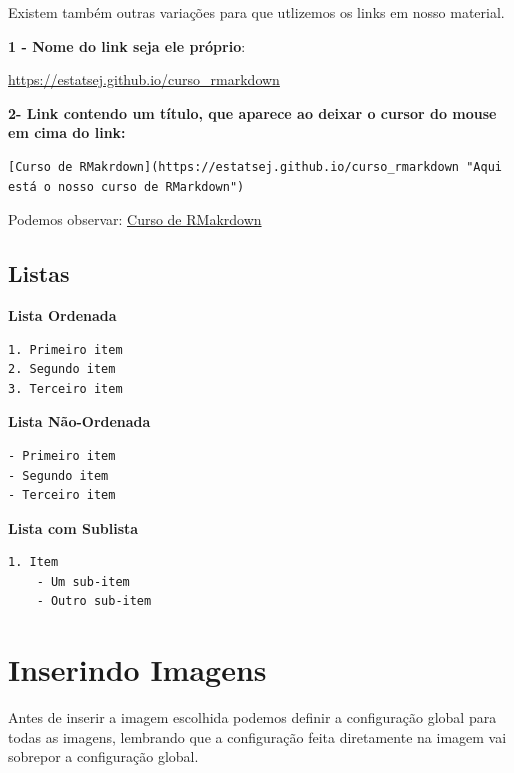 \documentclass[
]{book}
\newenvironment{Shaded}{\begin{snugshade}}{\end{snugshade}}
\newcommand{\InformationTok}[1]{\textcolor[rgb]{0.56,0.35,0.01}{\textbf{\textit{#1}}}}
\begin{document}
Existem também outras variações para que utlizemos os links em nosso material.

\textbf{1 - Nome do link seja ele próprio}:

\url{https://estatsej.github.io/curso_rmarkdown}

\textbf{2- Link contendo um título, que aparece ao deixar o cursor do mouse em cima do link:}

\begin{verbatim}
[Curso de RMakrdown](https://estatsej.github.io/curso_rmarkdown "Aqui está o nosso curso de RMarkdown")
\end{verbatim}

Podemos observar:
\href{https://estatsej.github.io/curso_rmarkdown}{Curso de RMakrdown}

\hypertarget{listas}{%
\subsection{Listas}\label{listas}}

\textbf{Lista Ordenada}

\begin{verbatim}
1. Primeiro item
2. Segundo item
3. Terceiro item
\end{verbatim}

\textbf{Lista Não-Ordenada}

\begin{verbatim}
- Primeiro item
- Segundo item
- Terceiro item
\end{verbatim}

\textbf{Lista com Sublista}

\begin{verbatim}
1. Item
    - Um sub-item
    - Outro sub-item
\end{verbatim}

\hypertarget{inserindo-imagens}{%
\section{Inserindo Imagens}\label{inserindo-imagens}}

Antes de inserir a imagem escolhida podemos definir a configuração global para todas as imagens, lembrando que a configuração feita diretamente na imagem vai sobrepor a configuração global.

\begin{Shaded}
\end{Shaded}
\end{document}
